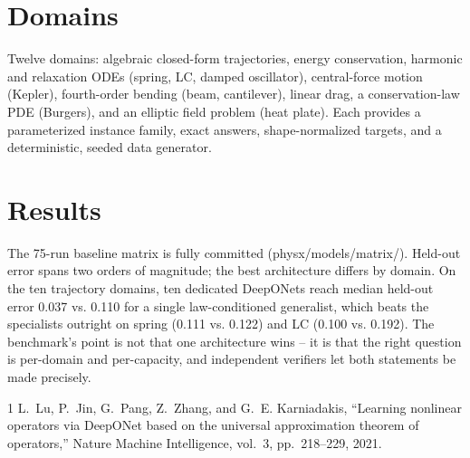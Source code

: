 \documentclass[conference,10pt]{IEEEtran}
\begin{document}
\section{Domains}
Twelve domains: algebraic closed-form trajectories, energy conservation, harmonic and relaxation ODEs (spring, LC, damped oscillator), central-force motion (Kepler), fourth-order bending (beam, cantilever), linear drag, a conservation-law PDE (Burgers), and an elliptic field problem (heat plate). Each provides a parameterized instance family, exact answers, shape-normalized targets, and a deterministic, seeded data generator.

\section{Results}
The 75-run baseline matrix is fully committed (physx/models/matrix/). Held-out error spans two orders of magnitude; the best architecture differs by domain. On the ten trajectory domains, ten dedicated DeepONets reach median held-out error 0.037 vs. 0.110 for a single law-conditioned generalist, which beats the specialists outright on spring (0.111 vs. 0.122) and LC (0.100 vs. 0.192). The benchmark's point is not that one architecture wins -- it is that the right question is per-domain and per-capacity, and independent verifiers let both statements be made precisely.

\begin{thebibliography}{1}
 L.~Lu, P.~Jin, G.~Pang, Z.~Zhang, and G.~E. Karniadakis, ``Learning nonlinear operators via DeepONet based on the universal approximation theorem of operators,'' Nature Machine Intelligence, vol.~3, pp.~218--229, 2021.
\end{thebibliography}
\end{document}
